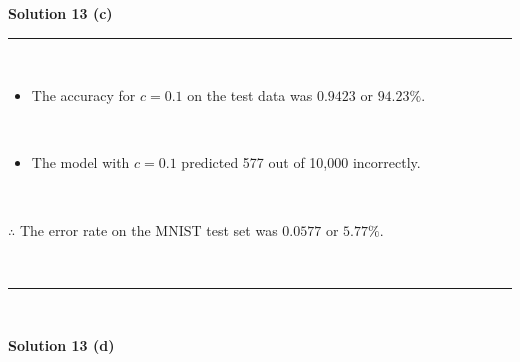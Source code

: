 \documentclass{article}
\begin{document}
\newpage

\parbox{\textwidth}{\textbf{Solution 13 (c)}}
\noindent\rule{\textwidth}{0.4pt}\\
\begin{itemize}
    \item \parbox{\textwidth}{The accuracy for $c=0.1$ on the test data was $0.9423$ or $94.23\%$.}\\
    \item \parbox{\textwidth}{The model with $c=0.1$ predicted 577 out of 10,000 incorrectly.}\\
\end{itemize}
\parbox{\textwidth}{$\therefore$ The error rate on the MNIST test set was $0.0577$ or $5.77\%$.}\\
\noindent\rule{\textwidth}{0.4pt}\\

\newpage
\parbox{\textwidth}{\textbf{Solution 13 (d)}}
\end{document}
